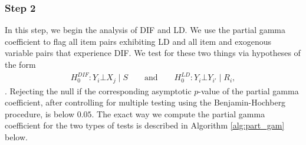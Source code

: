 \documentclass[a4project,12pt]{article}
\theoremstyle{examplestyle}
\theoremstyle{defstyle}
\theoremstyle{thmstyle}
\begin{document}
\subsubsection{Step 2}
In this step, we begin the analysis of DIF and LD. We use the partial gamma coefficient to flag all item pairs exhibiting LD and all item and exogenous variable pairs that experience DIF. We test for these two things via hypotheses of the form
\begin{align*}
    H_0^{DIF}: Y_i \bot X_j  \mid S \qquad \text{and} \qquad H_0^{LD}:Y_i \bot Y_{i'} \mid R_i,
\end{align*}
\cite{kreiner-christensen-2011}. Rejecting the null if the corresponding asymptotic $p$-value of the partial gamma coefficient, after controlling for multiple testing using the Benjamin-Hochberg procedure, is below $0.05$. The exact way we compute the partial gamma coefficient for the two types of tests is described in Algorithm \ref{alg:part_gam} below. 
\end{document}
